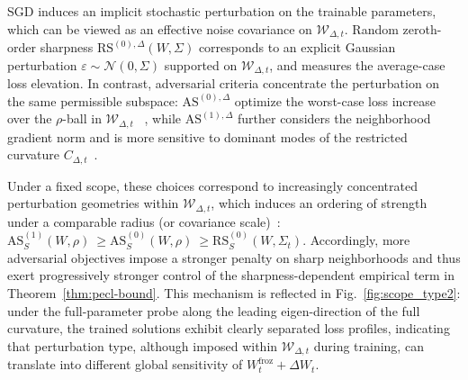 \documentclass[10pt]{article} %
\begin{document}
SGD induces an implicit stochastic perturbation on the trainable parameters, which can be viewed as an effective noise covariance on $\mathcal W_{\Delta,t}$\cite{pmlr-v97-zhu19e}. Random zeroth-order sharpness $\mathrm{RS}^{(0),\Delta}(W,\Sigma)$ corresponds to an explicit Gaussian perturbation $\varepsilon\sim\mathcal N(0,\Sigma)$ supported on $\mathcal W_{\Delta,t}$, and measures the average-case loss elevation. In contrast, adversarial criteria concentrate the perturbation on the same permissible subspace: $\mathrm{AS}^{(0),\Delta}$ optimize the worst-case loss increase over the $\rho$-ball in $\mathcal W_{\Delta,t}$ ~\cite{foretSharpnessAwareMinimizationEfficiently2021}, while $\mathrm{AS}^{(1),\Delta}$ further considers the neighborhood gradient norm and is more sensitive to dominant modes of the restricted curvature $C_{\Delta,t}$~\cite{Zhang_GAM}. 




Under a fixed scope, these choices correspond to increasingly concentrated perturbation geometries within $\mathcal W_{\Delta,t}$, which induces an ordering of strength under a comparable radius (or covariance scale)~\cite{mollenhoffSAMOptimalRelaxation2022,Zhang_GAM}:
$ \mathrm{AS}^{(1)}_S(W,\rho)\ \ge \mathrm{AS}^{(0)}_S(W,\rho)\ \ge \mathrm{RS}^{(0)}_S(W,\Sigma_t).$
Accordingly, more adversarial objectives impose a stronger penalty on sharp neighborhoods and thus exert progressively stronger control of the sharpness-dependent empirical term in Theorem~\ref{thm:pecl-bound}.
This mechanism is reflected in Fig.~\ref{fig:scope_type2}: under the full-parameter probe along the leading eigen-direction of the full curvature, the trained solutions exhibit clearly separated loss profiles, indicating that perturbation type, although imposed within $\mathcal W_{\Delta,t}$ during training, can translate into different global sensitivity of $W^{\mathrm{froz}}_t+\Delta W_t$.
\end{document}
